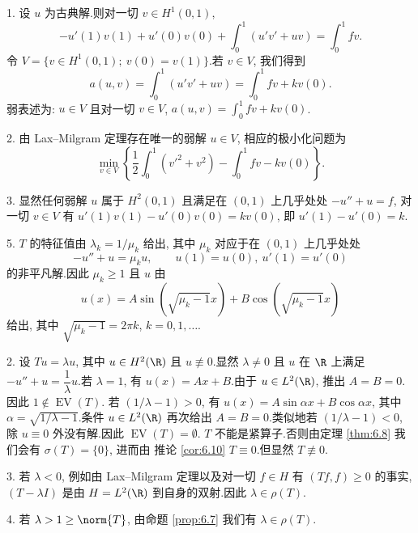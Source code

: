 
1. 设 $u$ 为古典解.则对一切 $v\in H^1(0,1)$,
\begin{equation*}
-u'(1)v(1)+u'(0)v(0)+\int_0^1(u'v'+uv)=\int_0^1fv.
\end{equation*}
令 $V=\{v\in H^1(0,1);\ v(0)=v(1)\}$.若 $v\in V$, 我们得到
\begin{equation*}
a(u,v)=\int_0^1(u'v'+uv)=\int_0^1fv+kv(0).
\end{equation*}
弱表述为: $u\in V$ 且对一切 $v\in V$, $a(u,v)=\int_0^1fv+kv(0)$.

2. 由 Lax--Milgram 定理存在唯一的弱解 $u\in V$, 相应的极小化问题为
\begin{equation*}
\min_{v\in V}\left\{\frac12\int_0^1(v'^2+v^2)-\int_0^1fv-kv(0)\right\}.
\end{equation*}

3. 显然任何弱解 $u$ 属于 $H^2(0,1)$ 且满足在 $(0,1)$ 上几乎处处 $-u''+u=f$,
对一切 $v\in V$ 有 $u'(1)v(1)-u'(0)v(0)=kv(0)$, 即 $u'(1)-u'(0)=k$.

5. $T$ 的特征值由 $\lambda_k=1/\mu_k$ 给出, 其中 $\mu_k$ 对应于在 $(0,1)$
上几乎处处
\begin{equation*}
-u''+u=\mu_ku,\qquad u(1)=u(0),\ u'(1)=u'(0)
\end{equation*}
的非平凡解.因此 $\mu_k\ge1$ 且 $u$ 由
\begin{equation*}
u(x)=A\sin(\sqrt{\mu_k-1}x)+B\cos(\sqrt{\mu_k-1}x)
\end{equation*}
给出, 其中 $\sqrt{\mu_k-1}=2\pi k$, $k=0,1,\dots$.


2. 设 $Tu=\lambda u$, 其中 $u\in H^2(\R)$ 且 $u\not\equiv0$.显然 $\lambda\ne0$
且 $u$ 在 $\R$ 上满足 $-u''+u=\dfrac1\lambda u$.若 $\lambda=1$, 有
$u(x)=Ax+B$.由于 $u\in L^2(\R)$, 推出 $A=B=0$.因此 $1\notin\operatorname{EV}(T)$.
若 $(1/\lambda-1)>0$, 有 $u(x)=A\sin\alpha x+B\cos\alpha x$, 其中
$\alpha=\sqrt{1/\lambda-1}$.条件 $u\in L^2(\R)$ 再次给出 $A=B=0$.类似地若
$(1/\lambda-1)<0$, 除 $u\equiv0$ 外没有解.因此 $\operatorname{EV}(T)=\emptyset$.
$T$ 不能是紧算子.否则由定理  \ref{thm:6.8} 我们会有 $\sigma(T)=\{0\}$, 进而由
推论  \ref{cor:6.10} $T\equiv0$.但显然 $T\not\equiv0$.

3. 若 $\lambda<0$, 例如由 Lax--Milgram 定理以及对一切 $f\in H$ 有 $(Tf,f)\ge0$
的事实, $(T-\lambda I)$ 是由 $H=L^2(\R)$ 到自身的双射.因此 $\lambda\in\rho(T)$.

4. 若 $\lambda>1\ge\norm{T}$, 由命题  \ref{prop:6.7} 我们有 $\lambda\in\rho(T)$.

